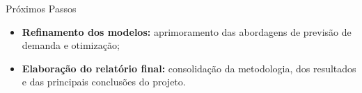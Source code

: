 \documentclass[aspectratio=169,11pt]{beamer}
\begin{document}
\begin{frame}{Próximos Passos}
    \small

    \begin{itemize}
        \setlength{\itemsep}{1.2cm}

        \item \textbf{Refinamento dos modelos:}
        aprimoramento das abordagens de previsão
        de demanda e otimização;

        \item \textbf{Elaboração do relatório final:}
        consolidação da metodologia, dos resultados
        e das principais conclusões do projeto.

    \end{itemize}

\end{frame}
\end{document}

